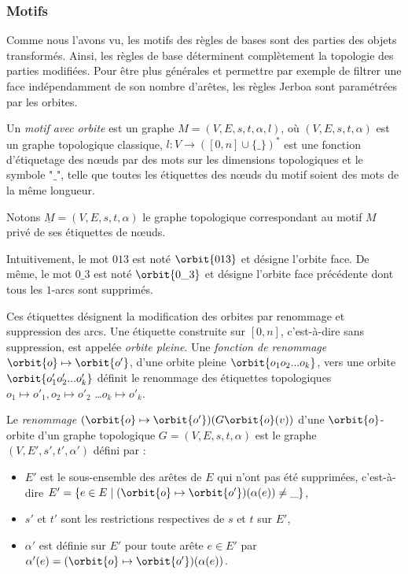 \subsubsection[Motifs]{Motifs}
\label{sec:etat-art-regles-jerboa-motifs}

Comme nous l'avons vu, les motifs des règles de bases sont des parties des objets transformés. Ainsi, les règles de base déterminent complètement la topologie des parties modifiées.
Pour être plus générales et permettre par exemple de filtrer une face indépendamment de son nombre d'arêtes, les règles Jerboa sont paramétrées par les orbites.

Un \emph{motif avec orbite} est un graphe $M=(V,E,s,t,\alpha,l)$, où $(V,E,s,t,\alpha)$ est un graphe topologique classique,  $l : V \rightarrow ([0,n] \cup \{ \_ \})^*$ est une fonction d'étiquetage des nœuds par des mots sur les dimensions topologiques et le symbole "$\_$", telle que toutes les étiquettes des nœuds du motif soient des mots de la même longueur.

Notons $\underline{M} = (V, E, s, t, \alpha)$ le graphe topologique correspondant au motif $M$ privé de ses étiquettes de nœuds.


Intuitivement, le mot $013$ est noté $\orbit{013}$ et désigne l'orbite face. De même, le mot $0\_3$ est noté $\orbit{0\_3}$ et désigne l'orbite face précédente dont tous les $1$-arcs sont supprimés.

Ces étiquettes désignent la modification des orbites par renommage et suppression des arcs. Une étiquette construite sur $[0,n]$, c'est-à-dire sans suppression, est appelée \emph{orbite pleine}. Une \emph{fonction de renommage} $\orbit{o} \mapsto \orbit{o'}$, d'une orbite pleine $\orbit{o_1 o_2 ... o_k}$, vers une orbite $\orbit{o'_1 o'_2 ... o'_k}$ définit le renommage des étiquettes topologiques $o_1 \mapsto o'_1, o_2 \mapsto o'_2$ \ldots $o_k \mapsto o'_k$.

Le \emph{renommage} $(\orbit{o} \mapsto \orbit{o'})(G\orbit{o}(v))$ d'une $\orbit{o}$-orbite d'un graphe topologique $G=(V,E,s,t,\alpha)$ est le graphe $(V,E',s',t',\alpha')$ défini par :
\begin{itemize}
	\item $E'$ est le sous-ensemble des arêtes de $E$ qui n'ont pas été supprimées, c'est-à-dire $E'=\{e \in E \mid (\orbit{o} \mapsto \orbit{o'})(\alpha(e)) \neq \_ \}$,

	\item $s'$ et $t'$ sont les restrictions respectives de $s$ et $t$ sur $E'$,

	\item $\alpha'$ est définie sur $E'$ pour toute arête $e \in E'$ par $\alpha'(e) = (\orbit{o} \mapsto \orbit{o'})(\alpha(e))$.
\end{itemize}

